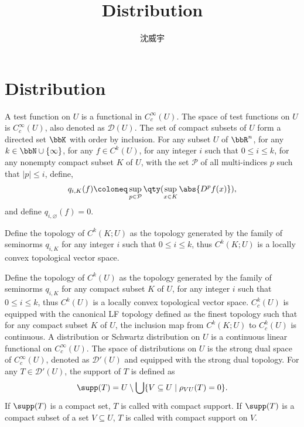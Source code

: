 \documentclass[a4paper,12pt]{report}
\begin{document}
\title{Distribution}
\author{沈威宇}
\date{\temtoday}
\titletocdoc
\section{Distribution}
A test function on $U$ is a functional in $C^{\infty}_c(U)$. The space of test functions on $U$ is $C^{\infty}_c(U)$, also denoted as $\mathcal{D}(U)$.
The set of compact subsets of $U$ form a directed set $\bbK$ with order by inclusion.
For any subset $U$ of $\bbR^n$, for any $k\in\bbN\cup\{\infty\}$, for any $f\in C^k(U)$, for any integer $i$ such that $0\leq i\leq k$, for any nonempty compact subset $K$ of $U$, with the set $\mathcal{P}$ of all multi-indices $p$ such that $|p|\leq i$, define,
\[q_{i,K}(f)\coloneq\sup_{p\in\mathcal{P}}\qty(\sup_{x\in K}\abs{D^pf(x)}),\]
and define $q_{i,\varnothing}(f)=0$.

Define the topology of $C^k(K;U)$ as the topology generated by the family of seminorms $q_{i,K}$ for any integer $i$ such that $0\leq i\leq k$, thus $C^k(K;U)$ is a locally convex topological vector space.

Define the topology of $C^k(U)$ as the topology generated by the family of seminorms $q_{i,K}$ for any compact subset $K$ of $U$, for any integer $i$ such that $0\leq i\leq k$, thus $C^k(U)$ is a locally convex topological vector space.
$C^k_c(U)$ is equipped with the canonical LF topology defined as the finest topology such that for any compact subset $K$ of $U$, the inclusion map from $C^k(K;U)$ to $C^k_c(U)$ is continuous.
A distribution or Schwartz distribution on $U$ is a continuous linear functional on $C^{\infty}_c(U)$. The space of distributions on $U$ is the strong dual space of $C^{\infty}_c(U)$, denoted as $\mathcal{D}'(U)$ and equipped with the strong dual topology.
For any $T\in\mathcal{D}'(U)$, the support of $T$ is defined as
\[\supp(T)=U\setminus\bigcup\{V\subseteq U\mid\rho_{VU}(T)=0\}.\]
If $\supp(T)$ is a compact set, $T$ is called with compact support. If $\supp(T)$ is a compact subset of a set $V\subseteq U$, $T$ is called with compact support on $V$.
\end{document}
